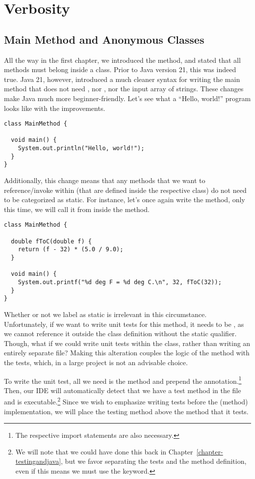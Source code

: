 \section{Verbosity}

\subsection{Main Method and Anonymous Classes}
All the way in the first chapter, we introduced the  method, and stated that all methods must belong inside a class. Prior to Java version 21, this was indeed true. Java 21, however, introduced a much cleaner syntax for writing the main method that does not need , nor , nor the input array of strings. These changes make Java much more beginner-friendly. Let's see what a ``Hello, world!'' program looks like with the improvements.

\begin{lstlisting}[language=MyJava]
class MainMethod {
  
  void main() {
    System.out.println("Hello, world!");
  }
}
\end{lstlisting}

Additionally, this change means that any methods that we want to reference/invoke within  (that are defined inside the respective class) do not need to be categorized as static. For instance, let's once again write the  method, only this time, we will call it from inside the  method.

\begin{lstlisting}[language=MyJava]
class MainMethod {

  double fToC(double f) {
    return (f - 32) * (5.0 / 9.0);
  }
  
  void main() {
    System.out.printf("%d deg F = %d deg C.\n", 32, fToC(32));
  }
}
\end{lstlisting}

Whether or not we label  as static is irrelevant in this circumstance. Unfortunately, if we want to write unit tests for this method, it needs to be , as we cannot reference it outside the class definition without the static qualifier. Though, what if we could write unit tests within the  class, rather than writing an entirely separate file? Making this alteration couples the logic of the method with the tests, which, in a large project is not an advisable choice. 

To write the unit test, all we need is the  method and prepend the  annotation.\footnote{The respective import statements are also necessary.} Then, our IDE will automatically detect that we have a test method in the file and is executable.\footnote{We will note that we could have done this back in Chapter~\ref{chapter-testingandjava}, but we favor separating the tests and the method definition, even if this means we must use the  keyword.} Since we wish to emphasize writing tests before the (method) implementation, we will place the testing method above the method that it tests. 

